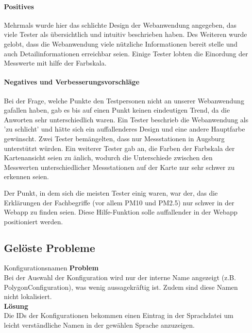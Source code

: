       \paragraph{Positives}
        Mehrmals wurde hier das schlichte Design der Webanwendung angegeben, das viele Tester als übersichtlich und intuitiv beschrieben haben.
        Des Weiteren wurde gelobt, dass die Webanwendung viele nützliche Informationen bereit stelle und auch Detailinformationen erreichbar seien.
        Einige Tester lobten die Einordung der Messwerte mit hilfe der Farbskala.
     
      \paragraph{Negatives und Verbesserungsvorschläge}
        Bei der Frage, welche Punkte den Testpersonen nicht an unserer Webanwendung gafallen haben, gab es bis auf einen Punkt keinen eindeutigen Trend, da die Anworten sehr unterschiedlich waren.
        Ein Tester beschrieb die Webanwendung als 'zu schlicht' und hätte sich ein auffallenderes Design und eine andere Hauptfarbe gewünscht.
        Zwei Tester bemängelten, dass nur Messstationen in Augsburg unterstützt würden.
        Ein weiterer Tester gab an, die Farben der Farbskala der Kartenansicht seien zu änlich, wodurch die Unterschiede zwischen den Messwerten unterschiedlicher Messstationen auf der Karte nur sehr schwer zu erkennen seien.
        
        Der Punkt, in dem sich die meisten Tester einig waren, war der, das die Erklärungen der Fachbegriffe (vor allem PM10 und PM2.5) nur schwer in der Webapp zu finden seien. Diese Hilfe-Funktion solle auffallender in der Webapp positioniert werden.

  \subsection{Gelöste Probleme}

    \begin{Bug}{Konfigurationsnamen}
      \textbf{Problem}\\
      Bei der Auswahl der Konfiguration wird nur der interne Name angezeigt (z.B. PolygonConfiguration),
      was wenig aussagekräftig ist. Zudem sind diese Namen nicht lokalisiert.\\
      \linebreak
      \textbf{Lösung}\\
      Die IDs der Konfigurationen bekommen einen Eintrag in der Sprachdatei um leicht verständliche
      Namen in der gewählen Sprache anzuzeigen.\\
    \end{Bug}

